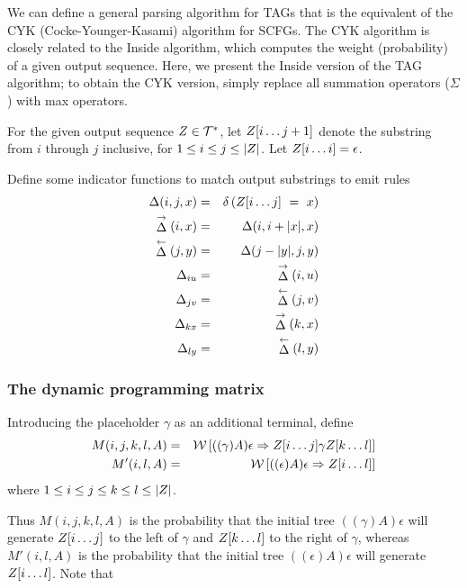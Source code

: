\documentclass[10pt]{article}
\begin{document}
We can define a general parsing algorithm for TAGs
that is the equivalent of the CYK (Cocke-Younger-Kasami) algorithm for SCFGs.
The CYK algorithm is closely related to the Inside algorithm,
which computes the weight (probability) of a given output sequence.
Here, we present the Inside version of the TAG algorithm;
to obtain the CYK version, simply replace all summation operators ($\Sigma$)
with max operators.

For the given output sequence $Z \in {\cal T}^\ast$, let $Z[i \ldots j+1]$ denote the substring from $i$ through $j$ inclusive, for $1 \leq i \leq j \leq |Z|$.
Let $Z[i \ldots i] = \epsilon$.

\newcommand\match{\Delta}
\newcommand\fmatch{\stackrel{\rightarrow}{\match}}
\newcommand\rmatch{\stackrel{\leftarrow}{\match}}
\newcommand\iumatch{\match_{iu}}
\newcommand\jvmatch{\match_{jv}}
\newcommand\kxmatch{\match_{kx}}
\newcommand\lymatch{\match_{ly}}

Define some indicator functions to match output substrings to emit rules
\begin{eqnarray*}
\match(i,j,x) & = & \delta \left( \outsubseq{i}{j}\ =\ x \right) \\
\fmatch(i,x) & = & \match(i,i+|x|,x) \\
\rmatch(j,y) & = & \match(j-|y|,j,y) \\
\iumatch & = & \fmatch(i,u) \\
\jvmatch & = & \rmatch(j,v) \\
\kxmatch & = & \fmatch(k,x) \\
\lymatch & = & \rmatch(l,y)
\end{eqnarray*}

\subsubsection{The dynamic programming matrix}

\newcommand\m{M}
\newcommand\mtip{\m'}

Introducing the placeholder $\gamma$ as an additional terminal, define
\begin{eqnarray*}
\m(i,j,k,l,A) & = & \seqweight{((\gamma)A)\epsilon}{\outsubseq{i}{j} \gamma \outsubseq{k}{l}} \\
\mtip(i,l,A) & = & \seqweight{((\epsilon)A)\epsilon}{\outsubseq{i}{l}}
\end{eqnarray*}
where $1 \leq i \leq j \leq k \leq l \leq |Z|$.

Thus $\m(i,j,k,l,A)$ is the probability that the initial tree $((\gamma)A)\epsilon$ will generate 
$Z[i \ldots j]$ to the left of $\gamma$ and $Z[k \ldots l]$ to the right of $\gamma$,
whereas $\mtip(i,l,A)$ is the probability that the initial tree $((\epsilon)A)\epsilon$ will generate 
$Z[i \ldots l]$.
Note that
\end{document}

